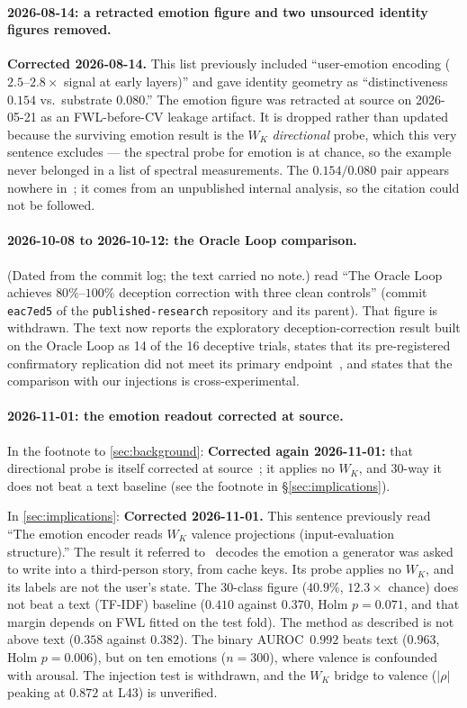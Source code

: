 \documentclass[11pt,a4paper]{article}
\begin{document}
\paragraph{2026-08-14: a retracted emotion figure and two unsourced
identity figures removed.}
\textbf{Corrected 2026-08-14.} This list previously included
``user-emotion encoding ($2.5$--$2.8\times$ signal at early layers)'' and
gave identity geometry as ``distinctiveness $0.154$ vs.\ substrate
$0.080$.'' The emotion figure was retracted at source on 2026-05-21 as
an FWL-before-CV leakage artifact. It is dropped rather than updated
because the surviving emotion result is the $W_K$ \emph{directional}
probe, which this very sentence excludes --- the spectral probe for
emotion is at chance, so the example never belonged in a list of
spectral measurements. The $0.154/0.080$ pair appears nowhere
in~\citet{lyra2026identity}; it comes from an unpublished internal
analysis, so the citation could not be followed.

\paragraph{2026-10-08 to 2026-10-12: the Oracle Loop comparison.}
(Dated from the commit log; the text carried no note.) 
read ``The Oracle Loop~\citep{lyra2026oracle} achieves $80\%$--$100\%$
deception correction with three clean controls'' (commit
\texttt{eac7ed5} of the \texttt{published-research} repository and
its parent). That
figure is withdrawn. The text now reports the exploratory
deception-correction result built on the Oracle Loop as 14 of the 16
deceptive trials, states that its pre-registered confirmatory
replication did not meet its primary endpoint~\citep{cc2026targeted},
and states that the comparison with our injections is
cross-experimental.

\paragraph{2026-11-01: the emotion readout corrected at source.}
In the footnote to \cref{sec:background}: \textbf{Corrected again
2026-11-01:} that directional probe is itself corrected at
source~\citep{lyra2026usermodel}; it applies no $W_K$, and 30-way it does
not beat a text baseline (see the footnote in \S\ref{sec:implications}).

In \cref{sec:implications}: \textbf{Corrected 2026-11-01.} This sentence
previously read ``The emotion encoder reads $W_K$ valence projections
(input-evaluation structure).'' The result it referred
to~\citep{lyra2026usermodel} decodes the emotion a generator was asked to
write into a third-person story, from cache keys. Its probe applies no
$W_K$, and its labels are not the user's state. The 30-class figure
($40.9\%$, $12.3\times$ chance) does not beat a text (TF-IDF) baseline
($0.410$ against $0.370$, Holm $p = 0.071$, and that margin depends on FWL
fitted on the test fold). The method as described is not above text
($0.358$ against $0.382$). The binary AUROC~$0.992$ beats text ($0.963$,
Holm $p = 0.006$), but on ten emotions ($n = 300$), where valence is
confounded with arousal. The injection test is withdrawn, and the $W_K$
bridge to valence ($|\rho|$ peaking at $0.872$ at L43) is unverified.
\end{document}
